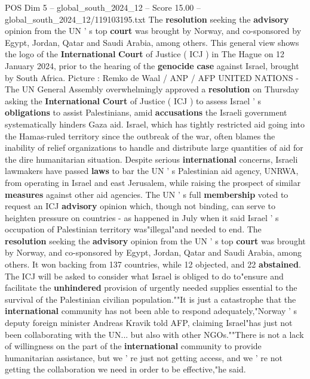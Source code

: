 \begin{textsample}{POS Dim 5 – global\_south\_2024\_12 – Score 15.00 – global\_south\_2024\_12/119103195.txt}  \label{ex:f5_pos_057}
The \textbf{resolution} seeking the \textbf{advisory} opinion from the UN ' s top \textbf{court} was brought by Norway, and co-sponsored by Egypt, Jordan, Qatar and Saudi Arabia, among others.
This general view shows the logo of the \textbf{International} \textbf{Court} of Justice ( ICJ ) in The Hague on 12 January 2024, prior to the hearing of the \textbf{genocide} \textbf{case} against Israel, brought by South Africa.
Picture : Remko de Waal / ANP / AFP UNITED NATIONS - The UN General Assembly overwhelmingly approved a \textbf{resolution} on Thursday asking the \textbf{International} \textbf{Court} of Justice ( ICJ ) to assess Israel ' s \textbf{obligations} to assist Palestinians, amid \textbf{accusations} the Israeli government systematically hinders Gaza aid.
Israel, which has tightly restricted aid going into the Hamas-ruled territory since the outbreak of the war, often blames the inability of relief organizations to handle and distribute large quantities of aid for the dire humanitarian situation.
Despite serious \textbf{international} concerns, Israeli lawmakers have passed \textbf{laws} to bar the UN ' s Palestinian aid agency, UNRWA, from operating in Israel and east Jerusalem, while raising the prospect of similar \textbf{measures} against other aid agencies.
The UN ' s full \textbf{membership} voted to request an ICJ \textbf{advisory} opinion which, though not binding, can serve to heighten pressure on countries - as happened in July when it said Israel ' s occupation of Palestinian territory was"illegal"and needed to end.
The \textbf{resolution} seeking the \textbf{advisory} opinion from the UN ' s top \textbf{court} was brought by Norway, and co-sponsored by Egypt, Jordan, Qatar and Saudi Arabia, among others.
It won backing from 137 countries, while 12 objected, and 22 \textbf{abstained}.
The ICJ will be asked to consider what Israel is obliged to do to"ensure and facilitate the \textbf{unhindered} provision of urgently needed supplies essential to the survival of the Palestinian civilian population.""It is just a catastrophe that the \textbf{international} community has not been able to respond adequately,"Norway ' s deputy foreign minister Andreas Kravik told AFP, claiming Israel"has just not been collaborating with the UN... but also with other NGOs.""There is not a lack of willingness on the part of the \textbf{international} community to provide humanitarian assistance, but we ' re just not getting access, and we ' re not getting the collaboration we need in order to be effective,"he said.

\end{textsample}
